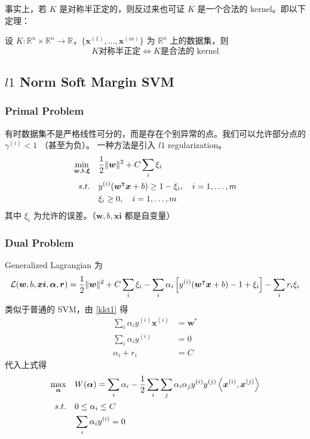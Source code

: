 		事实上，若 $ K $ 是对称半正定的，则反过来也可证 $ K $ 是一个合法的 kernel。即以下定理：
		\begin{thm}
			设 $ K: \mathbb{R}^n \times \mathbb{R}^n \to \mathbb{R} $，$ \{ \bm{x}^{(1)}, \ldots, \bm{x}^{(m)} \} $ 为 $ \mathbb{R}^n $ 上的数据集，则
			\[ K \text{对称半正定} \iff K \text{是合法的 kernel} \]
		\end{thm}
		
	\subsection{$ l1 $ Norm Soft Margin SVM}
		\subsubsection{Primal Problem}
		有时数据集不是严格线性可分的，而是存在个别异常的点。我们可以允许部分点的 $ \gamma^{(i)} < 1 $ （甚至为负）。
		一种方法是引入 $ l1 $ regularization。
		\begin{align*}
			\min_{\bm{w}, b, \bm{\xi}} \quad & \frac{1}{2} \| \bm{w} \|^2 + C \sum_i \xi_i \\
			s.t. \quad & y^{(i)} (\bm{w^}\intercal \bm{x} + b) \geq 1 - \xi_i, \quad i = 1, \ldots, m \\
			& \xi_i \geq 0, \quad i = 1, \ldots, m
		\end{align*}
		其中 $ \xi_i $ 为允许的误差。（$ \bm{w}, b, \bm{xi} $ 都是自变量）
		
		\subsubsection{Dual Problem}
		Generalized Lagrangian 为
		\begin{equation*}
			\mathcal{L}( \bm{w}, b, \bm{xi}, \bm{\alpha}, \bm{r} ) = \frac{1}{2} \| \bm{w} \|^2 + C \sum_i \xi_i - \sum_i \alpha_i \left[ y^{(i)} (\bm{w^}\intercal \bm{x} + b) - 1 + \xi_i \right] - \sum_i r_i \xi_i
		\end{equation*}
		类似于普通的 SVM，由 \eqref{kkt1} 得
		\begin{align}
			\sum_i \alpha_i y^{(i)} \bm{x}^{(i)} &= \bm{w}^* \\
			\sum_i \alpha_i y^{(i)} &= 0 \\
			\alpha_i + r_i &= C
		\end{align}
		代入上式得
		\begin{align}
			\max_{\bm{\alpha}} \quad & W(\bm{\alpha}) = \sum_i \alpha_i - \frac{1}{2} \sum_i \sum_j \alpha_i \alpha_j y^{(i)} y^{(j)} \left\langle \bm{x}^{(i)} , \bm{x}^{(j)} \right\rangle \\
			s.t. \quad & 0 \leq \alpha_i \leq C \\
			& \sum_i \alpha_i y^{(i)} = 0
		\end{align}
		
